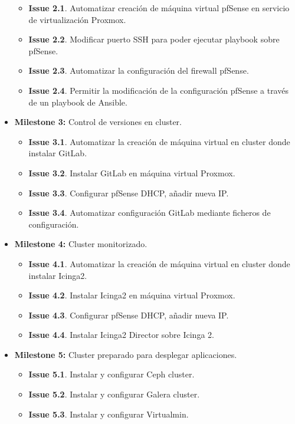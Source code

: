 \begin{text}
\begin{itemize}
				\begin{itemize}
					\item \textbf{Issue 2.1}. Automatizar creación de máquina virtual pfSense en servicio de virtualización Proxmox.
					\item \textbf{Issue 2.2}. Modificar puerto SSH para poder ejecutar playbook sobre pfSense.
					\item \textbf{Issue 2.3}. Automatizar la configuración del firewall pfSense.
					\item \textbf{Issue 2.4}. Permitir la modificación de la configuración pfSense a través de un playbook de Ansible.
				\end{itemize}
			\item \textbf{Milestone 3:} Control de versiones en cluster.
				\begin{itemize}
					\item \textbf{Issue 3.1}. Automatizar la creación de máquina virtual en cluster donde instalar GitLab.
					\item \textbf{Issue 3.2}. Instalar GitLab en máquina virtual Proxmox.
					\item \textbf{Issue 3.3}. Configurar pfSense DHCP, añadir nueva IP.
					\item \textbf{Issue 3.4}. Automatizar configuración GitLab mediante ficheros de configuración.
				\end{itemize}
			\item \textbf{Milestone 4:} Cluster monitorizado.
				\begin{itemize}
					\item \textbf{Issue 4.1}. Automatizar la creación de máquina virtual en cluster donde instalar Icinga2.
					\item \textbf{Issue 4.2}. Instalar Icinga2 en máquina virtual Proxmox.
					\item \textbf{Issue 4.3}. Configurar pfSense DHCP, añadir nueva IP.
					\item \textbf{Issue 4.4}. Instalar Icinga2 Director sobre Icinga 2.
				\end{itemize}
			\item \textbf{Milestone 5:} Cluster preparado para desplegar aplicaciones.
				\begin{itemize}
					\item \textbf{Issue 5.1}. Instalar y configurar Ceph cluster.
					\item \textbf{Issue 5.2}. Instalar y configurar Galera cluster.
					\item \textbf{Issue 5.3}. Instalar y configurar Virtualmin.

\end{itemize}
\end{itemize}
\end{text}
